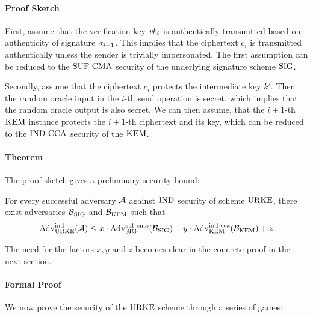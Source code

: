 \paragraph{Proof Sketch} 
First, assume that the verification key $\mathit{vk}_i$ is authentically transmitted based on authenticity of signature $\sigma_{i-1}$.
This implies that the ciphertext $c_i$ is transmitted authentically unless the sender is trivially impersonated.
The first assumption can be reduced to the ${\mathrm{SUF}\text{-}\mathrm{CMA}}$ security of the underlying signature scheme $\mathrm{SIG}$.

Secondly, assume that the ciphertext $c_i$ protects the intermediate key $k'$.
Then the random oracle input in the $i$-th send operation is secret, which implies that the random oracle output is also secret.
We can then assume, that the $i+1$-th $\mathrm{KEM}$ instance protects the $i+1$-th ciphertext and its key, which can be reduced to the ${\mathrm{IND}\text{-}\mathrm{CCA}}$ security of the $\mathrm{KEM}$.

\paragraph{Theorem}
The proof sketch gives a preliminary security bound:

For every successful adversary $\mathcal{A}$ against ${\mathrm{IND}}$ security of scheme $\mathrm{URKE}$, there exist adversaries $\mathcal{B}_{\mathrm{SIG}}$ and $\mathcal{B}_{\mathrm{KEM}}$ such that
\[\mathrm{Adv}_{\mathrm{URKE}}^{\mathrm{ind}} (\mathcal{A})\leq x\cdot \mathrm{Adv}_{\mathrm{SIG}}^{\mathrm{suf}\text{-}\mathrm{cma}}(\mathcal{B}_{\mathrm{SIG}}) + y\cdot \mathrm{Adv}_{\mathrm{KEM}}^{\mathrm{ind}\text{-}\mathrm{cca}}(\mathcal{B}_{\mathrm{KEM}})+z\]

The need for the factors $x, y$ and $z$ becomes clear in the concrete proof in the next section.

\paragraph{Formal Proof}
We now prove the security of the $\mathrm{URKE}$ scheme through a series of games:

